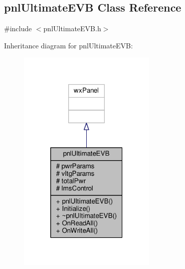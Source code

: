 \subsection{pnl\+Ultimate\+E\+VB Class Reference}
\label{classpnlUltimateEVB}


{\ttfamily \#include $<$pnl\+Ultimate\+E\+V\+B.\+h$>$}



Inheritance diagram for pnl\+Ultimate\+E\+VB\+:
\nopagebreak
\begin{figure}[H]
\begin{center}
\leavevmode
\includegraphics[width=187pt]{d4/d5e/classpnlUltimateEVB__inherit__graph}
\end{center}
\end{figure}


